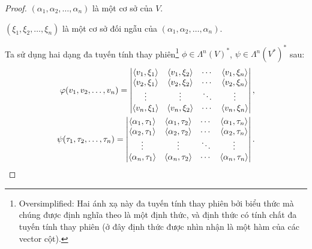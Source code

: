\documentclass[class=nhvh-linear-algebra,crop=false]{standalone}
\begin{document}
\begin{proof}
	\par $(\alpha_{1}, \alpha_{2}, \ldots, \alpha_{n})$ là một cơ sở của $V$.
	\par $(\xi_{1}, \xi_{2}, \ldots, \xi_{n})$ là một cơ sở đối ngẫu của $(\alpha_{1}, \alpha_{2}, \ldots, \alpha_{n})$.
	\par Ta sử dụng hai dạng đa tuyến tính thay phiên\footnote{Oversimplified: Hai ánh xạ này đa tuyến tính thay phiên bởi biểu thức mà chúng được định nghĩa theo là một định thức, và định thức có tính chất đa tuyến tính thay phiên (ở đây định thức được nhìn nhận là một hàm của các vector cột).} $\phi \in {\Lambda^{n}(V)}^{*}$, $\psi \in {\Lambda^{n}({V}^{*})}^{*}$ sau:
	\[
		\begin{split}
			\phi(v_{1}, v_{2}, \ldots, v_{n}) = \begin{vmatrix}
				                                    \dotprod{v_{1}, \xi_{1}} & \dotprod{v_{1}, \xi_{2}} & \cdots & \dotprod{v_{1}, \xi_{n}} \\
				                                    \dotprod{v_{2}, \xi_{1}} & \dotprod{v_{2}, \xi_{2}} & \cdots & \dotprod{v_{2}, \xi_{n}} \\
				                                    \vdots                   & \vdots                   & \ddots & \vdots                   \\
				                                    \dotprod{v_{n}, \xi_{1}} & \dotprod{v_{n}, \xi_{2}} & \cdots & \dotprod{v_{n}, \xi_{n}}
			                                    \end{vmatrix}, \\
			\psi(\tau_{1}, \tau_{2}, \ldots, \tau_{n}) = \begin{vmatrix}
				                                             \dotprod{\alpha_{1}, \tau_{1}} & \dotprod{\alpha_{1}, \tau_{2}} & \cdots & \dotprod{\alpha_{1}, \tau_{n}} \\
				                                             \dotprod{\alpha_{2}, \tau_{1}} & \dotprod{\alpha_{2}, \tau_{2}} & \cdots & \dotprod{\alpha_{2}, \tau_{n}} \\
				                                             \vdots                         & \vdots                         & \ddots & \vdots                         \\
				                                             \dotprod{\alpha_{n}, \tau_{1}} & \dotprod{\alpha_{n}, \tau_{2}} & \cdots & \dotprod{\alpha_{n}, \tau_{n}}
			                                             \end{vmatrix}.

\end{split}\]
\end{proof}
\end{document}
